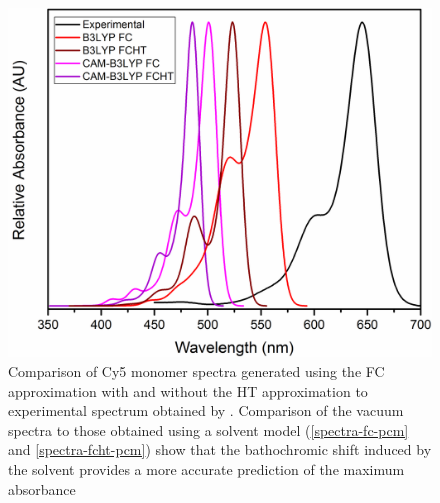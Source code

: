 \begin{figure}[h!]
  \centering
  \includegraphics[width=0.8\linewidth]{figures/pub1/FCHT-vac.pdf}
  \caption{Comparison of Cy5 monomer spectra generated using the FC approximation with and without the HT approximation to experimental spectrum obtained by \citet{Cannon2017}. Comparison of the vacuum spectra to those obtained using a solvent model (\autoref{spectra-fc-pcm} and \autoref{spectra-fcht-pcm}) show that the bathochromic shift induced by the solvent provides a more accurate prediction of the maximum absorbance}\label{spectra-vac}
\end{figure}